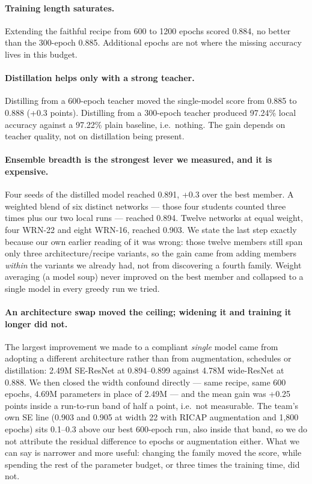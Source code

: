 \documentclass[letterpaper]{article} %
\begin{document}
\paragraph{Training length saturates.} Extending the faithful recipe from 600 to 1200 epochs
scored 0.884, no better than the 300-epoch 0.885. Additional epochs are not where the missing
accuracy lives in this budget.

\paragraph{Distillation helps only with a strong teacher.} Distilling from a 600-epoch teacher
moved the single-model score from 0.885 to 0.888 (+0.3 points). Distilling from a 300-epoch
teacher produced 97.24\% local accuracy against a 97.22\% plain baseline, i.e.\ nothing. The
gain depends on teacher quality, not on distillation being present.

\paragraph{Ensemble breadth is the strongest lever we measured, and it is expensive.} Four seeds
of the distilled model reached 0.891, +0.3 over the best member. A weighted blend of six
distinct networks --- those four students counted three times plus our two local runs --- reached
0.894. Twelve networks at equal weight, four WRN-22 and eight WRN-16, reached 0.903. We state
the last step exactly because our own earlier reading of it was wrong: those twelve members
still span only three architecture/recipe variants, so the gain came from adding members
\emph{within} the variants we already had, not from discovering a fourth family. Weight
averaging (a model soup) never improved on the best member and collapsed to a single model in
every greedy run we tried.

\paragraph{An architecture swap moved the ceiling; widening it and training it longer did not.}
The largest improvement we made to a compliant \emph{single} model came from adopting a different
architecture rather than from augmentation, schedules or distillation: 2.49M SE-ResNet at
0.894--0.899 against 4.78M wide-ResNet at 0.888. We then closed the width confound directly ---
same recipe, same 600 epochs, 4.69M parameters in place of 2.49M --- and the mean gain was +0.25
points inside a run-to-run band of half a point, i.e.\ not measurable. The team's own SE line
(0.903 and 0.905 at width 22 with RICAP augmentation and 1{,}800 epochs) sits 0.1--0.3 above our
best 600-epoch run, also inside that band, so we do not attribute the residual difference to
epochs or augmentation either. What we can say is narrower and more useful: changing the family
moved the score, while spending the rest of the parameter budget, or three times the training
time, did not.
\end{document}
